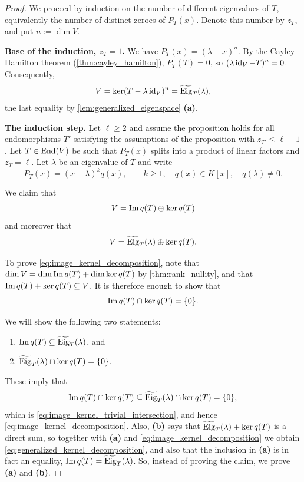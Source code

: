 \begin{proof}
We proceed by induction on the number of different eigenvalues of $T$, equivalently the number of distinct zeroes of $P_T(x)$. Denote this number by $z_T$, and put $n := \dim V$.

\textbf{Base of the induction, $z_T = 1$.} We have $P_T(x) = (\lambda - x)^n$. By the Cayley-Hamilton theorem (\cref{thm:cayley_hamilton}), $P_T(T) = 0$, so $(\lambda \operatorname{id}_V - T)^n = 0$. Consequently,
\[
    V = \ker(T - \lambda \operatorname{id}_V)^n = \widetilde{\operatorname{Eig}}_T(\lambda),
\]
the last equality by \cref{lem:generalized_eigenspace} \textbf{(a)}.

\textbf{The induction step.} Let $\ell \ge 2$ and assume the proposition holds for all endomorphisms $T'$ satisfying the assumptions of the proposition with $z_{T'} \le \ell - 1$. Let $T \in \operatorname{End}(V)$ be such that $P_T(x)$ splits into a product of linear factors and $z_T = \ell$. Let $\lambda$ be an eigenvalue of $T$ and write
\[
    P_T(x) = (x - \lambda)^k q(x), \qquad k \ge 1, \quad q(x) \in K[x], \quad q(\lambda) \neq 0.
\]

We claim that
\begin{equation}
\label{eq:image_kernel_decomposition}
    V = \operatorname{Im} q(T) \oplus \ker q(T)
\end{equation}
and moreover that
\begin{equation}
\label{eq:generalized_kernel_decomposition}
    V = \widetilde{\operatorname{Eig}}_T(\lambda) \oplus \ker q(T).
\end{equation}

To prove \eqref{eq:image_kernel_decomposition}, note that $\dim V = \dim \operatorname{Im} q(T) + \dim \ker q(T)$ by \cref{thm:rank_nullity}, and that $\operatorname{Im} q(T) + \ker q(T) \subseteq V$. It is therefore enough to show that
\begin{equation}
\label{eq:image_kernel_trivial_intersection}
    \operatorname{Im} q(T) \cap \ker q(T) = \{0\}.
\end{equation}

We will show the following two statements:
\begin{enumerate}[label=\textbf{(\alph*)}]
    \item $\operatorname{Im} q(T) \subseteq \widetilde{\operatorname{Eig}}_T(\lambda)$, and
    \item $\widetilde{\operatorname{Eig}}_T(\lambda) \cap \ker q(T) = \{0\}$.
\end{enumerate}
These imply that
\[
    \operatorname{Im} q(T) \cap \ker q(T) \subseteq \widetilde{\operatorname{Eig}}_T(\lambda) \cap \ker q(T) = \{0\},
\]
which is \eqref{eq:image_kernel_trivial_intersection}, and hence \eqref{eq:image_kernel_decomposition}. Also, \textbf{(b)} says that $\widetilde{\operatorname{Eig}}_T(\lambda) + \ker q(T)$ is a direct sum, so together with \textbf{(a)} and \eqref{eq:image_kernel_decomposition} we obtain \eqref{eq:generalized_kernel_decomposition}, and also that the inclusion in \textbf{(a)} is in fact an equality, $\operatorname{Im} q(T) = \widetilde{\operatorname{Eig}}_T(\lambda)$. So, instead of proving the claim, we prove \textbf{(a)} and \textbf{(b)}.


\end{proof}
